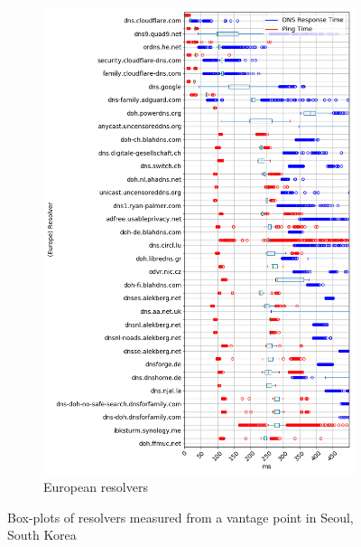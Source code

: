 \begin{figure}[t!]
\begin{subfigure}[t]{0.5\textwidth}
        \includegraphics[width=\linewidth]{figures/Seoul_Europe.png}
        \caption{European resolvers}
    \end{subfigure}

    \caption{Box-plots of resolvers measured from a vantage point in Seoul, South Korea}
\end{figure}




